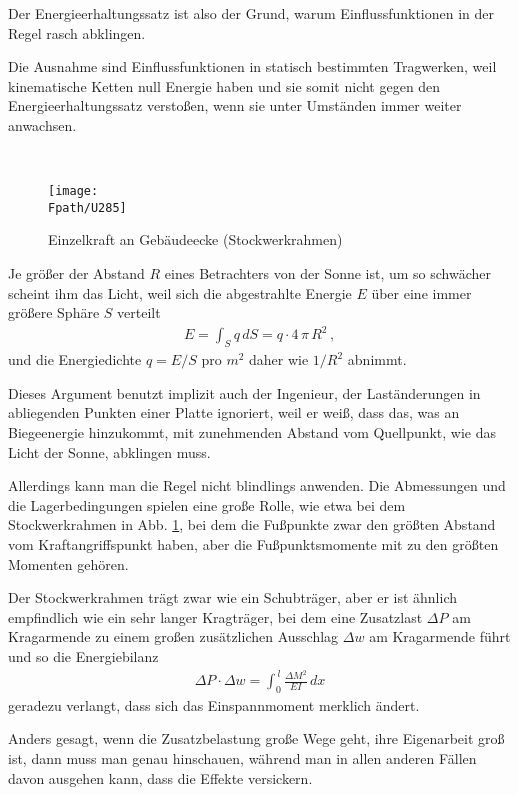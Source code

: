\hspace*{-12pt}\colorbox{highlightBlue}{\parbox{0.98\textwidth}{Der Energieerhaltungssatz ist also der Grund, warum Einflussfunktionen in der Regel rasch abklingen.

Die Ausnahme sind Einflussfunktionen in statisch bestimmten Tragwerken, weil kinematische Ketten null Energie haben und sie somit nicht gegen den Energieerhaltungssatz versto{\ss}en, wenn sie unter Umst\"{a}nden immer weiter anwachsen.}}\\


\begin{figure}
\centering
{\texttt{[image: \\Fpath/U285]}}
\caption{Einzelkraft an Geb\"{a}udeecke (Stockwerkrahmen) }
\label{U261}%
\end{figure}%

\begin{remark}
Je gr\"{o}{\ss}er der Abstand $R$ eines Betrachters von der Sonne ist, um so schw\"{a}cher scheint ihm das Licht, weil sich die abgestrahlte Energie $E$ \"{u}ber eine immer gr\"{o}{\ss}ere Sph\"{a}re $S$ verteilt
\begin{align}
E = \int_{S} q \,dS = q \cdot 4\,\pi\,R^2\,,
\end{align}
und die Energiedichte $q = E/S$ pro $m^2$ daher wie $1/R^2$ abnimmt.

Dieses Argument benutzt implizit auch der Ingenieur, der Last\"{a}nderungen in abliegenden Punkten einer Platte ignoriert, weil er wei{\ss}, dass das, was an Biegeenergie hinzukommt, mit zunehmenden Abstand vom Quellpunkt, wie das Licht der Sonne, abklingen muss.

Allerdings kann man die Regel nicht blindlings anwenden. Die Abmessungen und die  Lagerbedingungen spielen eine gro{\ss}e Rolle, wie etwa bei dem Stockwerkrahmen in Abb. \ref{U261}, bei dem die Fu{\ss}punkte zwar den gr\"{o}{\ss}ten Abstand vom Kraftangriffspunkt haben, aber die Fu{\ss}punktsmomente mit zu den gr\"{o}{\ss}ten Momenten geh\"{o}ren.

Der Stockwerkrahmen tr\"{a}gt zwar wie ein Schubtr\"{a}ger, aber er ist \"{a}hnlich empfindlich wie ein sehr langer Kragtr\"{a}ger, bei dem eine Zusatzlast $\Delta P$ am Kragarmende zu einem gro{\ss}en zus\"{a}tzlichen Ausschlag $\Delta w$ am Kragarmende f\"{u}hrt und so die Energiebilanz
\begin{align}
\Delta P \cdot \Delta w = \int_0^{\,l} \frac{\Delta M^2}{EI}\,dx
\end{align}
geradezu verlangt, dass sich das Einspannmoment merklich \"{a}ndert.

Anders gesagt, wenn die Zusatzbelastung gro{\ss}e Wege geht, ihre Eigenarbeit gro{\ss} ist, dann muss man genau hinschauen, w\"{a}hrend man in
allen anderen F\"{a}llen davon ausgehen kann, dass die Effekte \glq versickern\grq{}.
\end{remark}

